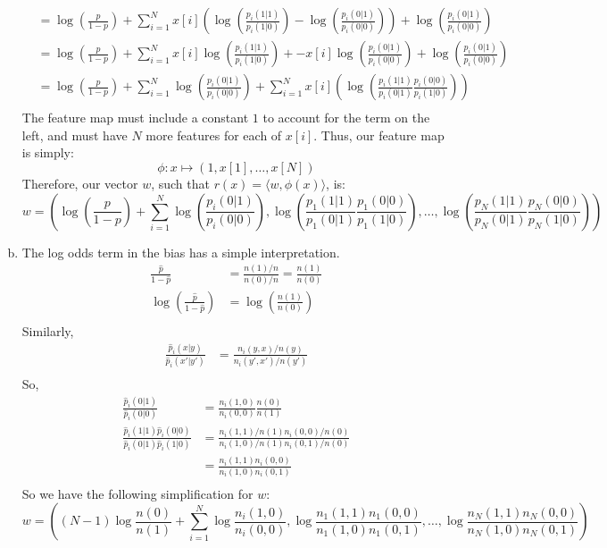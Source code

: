 \documentclass{amsart}
\theoremstyle{definition}
\begin{document}
\begin{enumerate}[(a)]
\begin{align*}
			&= \log\left(\frac{p}{1-p}\right) + \sum_{i=1}^{N}x[i]\left(\log\left(\frac{p_i(1|1)}{p_i(1|0)}\right) -\log\left(\frac{p_i(0|1)}{p_i(0|0)}\right)\right) + \log\left(\frac{p_i(0|1)}{p_i(0|0)}\right)\\
			&= \log\left(\frac{p}{1-p}\right) + \sum_{i=1}^{N}x[i]\log\left(\frac{p_i(1|1)}{p_i(1|0)}\right) + -x[i]\log\left(\frac{p_i(0|1)}{p_i(0|0)}\right) + \log\left(\frac{p_i(0|1)}{p_i(0|0)}\right) \\
			&= \log\left(\frac{p}{1-p}\right) + \sum_{i=1}^{N}\log\left(\frac{p_i(0|1)}{p_i(0|0)}\right) + \sum_{i=1}^{N}x[i]\left(\log\left(\frac{p_i(1|1)}{p_i(0|1)}\frac{p_i(0|0)}{p_i(1|0)}\right)\right)\\
		\end{align*}
		The feature map must include a constant $1$ to account for the term on the left, and must have $N$ more features for each of $x[i]$. Thus, our feature map is simply:
		\[\phi: x \mapsto (1, x[1], \ldots, x[N])\]
		Therefore, our vector $w$, such that $r(x) = \langle w, \phi(x)\rangle$, is:
		\[w = \left(\log\left(\frac{p}{1-p}\right) + \sum_{i=1}^{N}\log\left(\frac{p_i(0|1)}{p_i(0|0)}\right), \log\left(\frac{p_1(1|1)}{p_1(0|1)}\frac{p_1(0|0)}{p_1(1|0)}\right), \ldots, \log\left(\frac{p_N(1|1)}{p_N(0|1)}\frac{p_N(0|0)}{p_N(1|0)}\right)\right)\]
	\item 
		The log odds term in the bias has a simple interpretation. 
		\begin{align*}
			\frac{\hat{p}}{1-\hat{p}} &= \frac{n(1)/n}{n(0)/n} = \frac{n(1)}{n(0)}\\
			\log\left(\frac{\hat{p}}{1-\hat{p}}\right) &= \log\left(\frac{n(1)}{n(0)}\right)\\
		\end{align*}
		Similarly, 
		\begin{align*}
			\frac{\hat{p}_i(x|y)}{\hat{p}_i(x'|y')} &= \frac{n_i(y, x)/n(y)}{n_i(y',x')/n(y')}\\
		\end{align*}
		So, 
		\begin{align*}
			\frac{\hat{p}_i(0|1)}{\hat{p}_i(0|0)} &= \frac{n_i(1, 0)}{n_i(0, 0)}\frac{n(0)}{n(1)}\\
			\frac{\hat{p}_i(1|1)\hat{p}_i(0|0)}{\hat{p}_i(0|1)\hat{p}_i(1|0)} &= \frac{n_i(1, 1)/n(1) n_i(0, 0)/n(0)}{n_i(1, 0)/n(1) n_i(0, 1)/n(0)}\\
			&= \frac{n_i(1,1)n_i(0,0)}{n_i(1,0)n_i(0,1)}\\
		\end{align*}
		So we have the following simplification for $w$:
		\[w = \left((N-1)\log\frac{n(0)}{n(1)} + \sum_{i = 1}^{N} \log \frac{n_i(1, 0)}{n_i(0,0)}, \log \frac{n_1(1,1)n_1(0,0)}{n_1(1,0)n_1(0,1)}, \ldots, \log \frac{n_N(1,1)n_N(0,0)}{n_N(1,0)n_N(0,1)}\right)\]
\end{enumerate}
\end{document}
